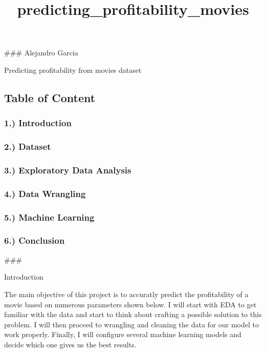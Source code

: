 \documentclass[11pt]{article}
\title{predicting\_profitability\_movies}
\begin{document}
    
    
    \maketitle
    
    

    
    \#\#\# Alejandro Garcia

Predicting profitability from movies dataset

    \subsection{Table of Content}\label{table-of-content}

\subsubsection{1.) Introduction}\label{introduction}

\subsubsection{2.) Dataset}\label{dataset}

\subsubsection{3.) Exploratory Data
Analysis}\label{exploratory-data-analysis}

\subsubsection{4.) Data Wrangling}\label{data-wrangling}

\subsubsection{5.) Machine Learning}\label{machine-learning}

\subsubsection{6.) Conclusion}\label{conclusion}

    \#\#\#

Introduction

The main objective of this project is to accuratly predict the
profitability of a movie based on numerous parameters shown below. I
will start with EDA to get familiar with the data and start to think
about crafting a possible solution to this problem. I will then proceed
to wrangling and cleaning the data for our model to work properly.
Finally, I will configure several machine learning models and decide
which one gives us the best results.
\end{document}
